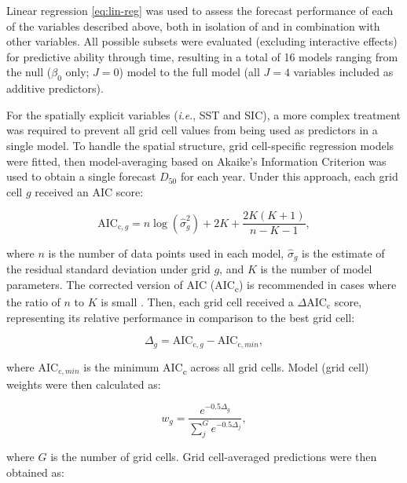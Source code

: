 \documentclass[12pt,]{book}
\theoremstyle{definition}
\theoremstyle{definition}
\theoremstyle{definition}
\theoremstyle{remark}
\begin{document}
\noindent
Linear regression \eqref{eq:lin-reg} was used to assess the forecast
performance of each of the variables described above, both in isolation
of and in combination with other variables. All possible subsets were
evaluated (excluding interactive effects) for predictive ability through
time, resulting in a total of 16 models ranging from the null
(\(\beta_0\) only; \(J = 0\)) model to the full model (all \(J=4\)
variables included as additive predictors).

For the spatially explicit variables (\emph{i}.\emph{e}., SST and SIC),
a more complex treatment was required to prevent all grid cell values
from being used as predictors in a single model. To handle the spatial
structure, grid cell-specific regression models were fitted, then
model-averaging \citep{burnham-anderson-2002} based on Akaike's
Information Criterion \citep[AIC,][]{akaike-1974} was used to obtain a
single forecast \(D_{50}\) for each year. Under this approach, each grid
cell \(g\) received an AIC score:

\begin{equation}
  \text{AIC}_{\text{c},g}=n \log{\left(\hat{\sigma}_g^2\right) + 2K + \frac{2K(K+1)}{n-K-1}},
  \label{eq:aicc}
\end{equation}

\noindent
where \(n\) is the number of data points used in each model,
\(\hat{\sigma}_g\) is the estimate of the residual standard deviation
under grid \(g\), and \(K\) is the number of model parameters. The
corrected version of AIC (AIC\textsubscript{c}) is recommended in cases
where the ratio of \(n\) to \(K\) is small
\citep{burnham-anderson-2002}. Then, each grid cell received a
\(\Delta\text{AIC}_\text{c}\) score, representing its relative
performance in comparison to the best grid cell:

\begin{equation}
  \Delta_g=\text{AIC}_{\text{c},g}-\text{AIC}_{\text{c},min},
  \label{eq:delta-aicc}
\end{equation}

\noindent
where \(\text{AIC}_{\text{c},min}\) is the minimum AIC\textsubscript{c}
across all grid cells. Model (grid cell) weights were then calculated
as:

\begin{equation}
  w_g=\frac{e^{-0.5\Delta_g}}{\sum_j^G e^{-0.5\Delta_j}},
\label{eq:aicc-weights}
\end{equation}

\noindent
where \(G\) is the number of grid cells. Grid cell-averaged predictions
were then obtained as:
\end{document}

